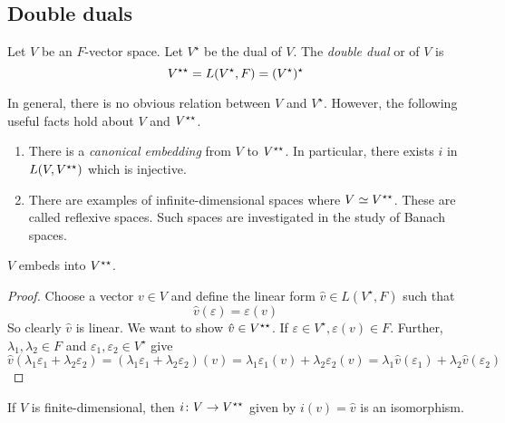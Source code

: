 \subsection{Double duals}
\begin{definition}
	Let \( V \) be an \( F \)-vector space.
	Let \( V^\star \) be the dual of \( V \).
	The \textit{double dual} or  of \( V \) is
	\[
		V^{\star\star} = L(V^\star, F) = (V^\star)^\star
	\]
\end{definition}
\begin{remark}
	In general, there is no obvious relation between \( V \) and \( V^\star \).
	However, the following useful facts hold about \( V \) and \( V^{\star\star} \).
	\begin{enumerate}
		\item There is a \textit{canonical embedding} from \( V \) to \( V^{\star\star} \).
		      In particular, there exists \( i \) in \( L(V, V^{\star\star}) \) which is injective.
		\item There are examples of infinite-dimensional spaces where \( V \simeq V^{\star\star} \).
		      These are called reflexive spaces.
		      Such spaces are investigated in the study of Banach spaces.
	\end{enumerate}
\end{remark}
\begin{theorem}
	\( V \) embeds into \( V^{\star\star} \).
\end{theorem}
\begin{proof}
	Choose a vector \( v \in V \) and define the linear form \( \hat v \in L(V^\star, F) \) such that
	\[
		\hat v(\varepsilon) = \varepsilon(v)
	\]
	So clearly \( \hat v \) is linear.
	We want to show \( \hat v \in V^{\star\star} \).
	If \( \varepsilon \in V^\star, \varepsilon(v) \in F \).
	Further, \( \lambda_1, \lambda_2 \in F \) and \( \varepsilon_1, \varepsilon_2 \in V^\star \) give
	\[
		\hat v (\lambda_1 \varepsilon_1 + \lambda_2 \varepsilon_2) = (\lambda_1 \varepsilon_1 + \lambda_2 \varepsilon_2)(v) = \lambda_1 \varepsilon_1(v) + \lambda_2 \varepsilon_2(v) = \lambda_1 \hat v(\varepsilon_1) + \lambda_2 \hat v(\varepsilon_2)
	\]
\end{proof}
\begin{theorem}
	If \( V \) is finite-dimensional, then \( i \colon V \to V^{\star\star} \) given by \( i(v) = \hat v \) is an isomorphism.
\end{theorem}
